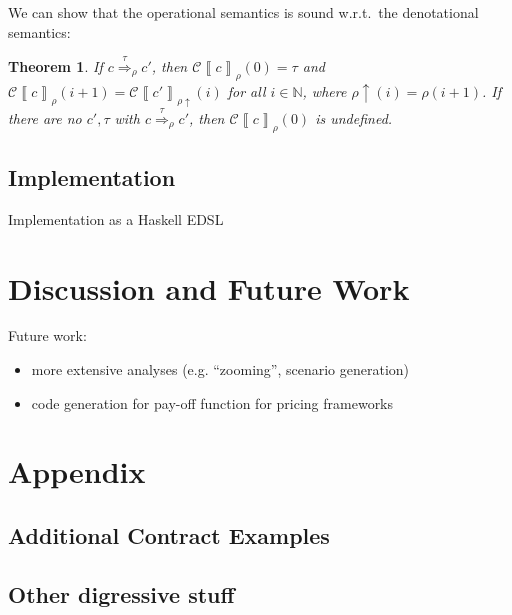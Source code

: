 \documentclass[a4paper,debug,twocolumn]{easychair}
\newcommand{\comm}[3][red]{{\small \color{#1}{$\spadesuit$#2: #3}}}
\newcommand{\jbcomment}[1]{\comm[orange]{jb}{#1}}
\newcommand\nats{{\mathbb N}}
\newcommand\cSem[2]{{\mathcal C}\left\llbracket#1\right\rrbracket_{#2}}
\newcommand\cRed[2]{\stackrel{#2}\Rightarrow_{#1}}
\newcommand\envAdv[1]{#1\uparrow}
\theoremstyle{plain}
\newtheorem{theorem}{Theorem}
\begin{document}
We can show that the operational semantics is sound w.r.t.\ the
denotational semantics:
\begin{theorem}
  If $c \cRed\rho\tau c'$, then $\cSem c {\rho} (0) = \tau$ and $\cSem
  c {\rho} (i+1) = \cSem{c'}{\envAdv{\rho}}(i)$ for all $i \in \nats$,
  where $\envAdv{\rho} (i) = \rho(i+1)$. If there are no $c', \tau$
  with $c \cRed\rho\tau c'$, then $\cSem c \rho (0)$ is undefined.
\end{theorem}



\subsection{Implementation}
\label{sec:implementation}

Implementation as a Haskell EDSL

\section{Discussion and Future Work}
\label{sec:disc-future-work}

Future work:
\begin{itemize}
\item more extensive analyses (e.g. ``zooming'', scenario generation)
\item code generation for pay-off function for pricing frameworks
\end{itemize}





\newpage
\appendix

\section*{Appendix}
\subsection*{Additional Contract Examples}
\jbcomment{Something from the FX portfolio, plus some asian option and the Lexifi barrier product (both use acc)}

\subsection*{Other digressive stuff}
\jbcomment{what else goes here? otherwise drop it}
\end{document}
